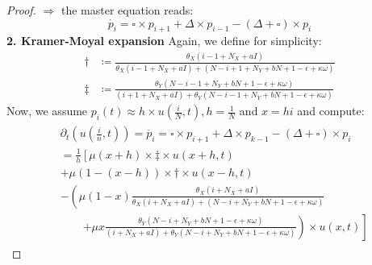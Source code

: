 \begin{proof}
$\Rightarrow$ the master equation reads:
\begin{equation}
	\dot{p_i} = \square\times p_{i+1} + \Delta\times p_{i-1} - \left(\Delta + \square\right)\times p_i
\end{equation}
\textbf{2. Kramer-Moyal expansion}\newline
Again, we define for simplicity:
\begin{align*}
\dagger &\coloneqq \frac{\theta_X (i-1 + N_X + aI)}{\theta_X (i-1 + N_X + aI) + (N-i+1 + N_Y + bN + 1-\epsilon + \kappa\omega)}\\
\ddagger &\coloneqq \frac{\theta_Y(N-i-1 + N_Y + bN +1-\epsilon+\kappa\omega)}{(i+1 + N_X+aI) + \theta_Y(N-i-1 + N_Y + bN +1-\epsilon+\kappa\omega)}
\end{align*}
Now, we assume $p_i(t) \approx h\times u\left(\frac{i}{N}, t\right), h=\frac{1}{N}$ and $x = hi$ and compute:
\begin{align}\label{computation}
\begin{split}
	&\partial_t \left(u\left(\frac{i}{n}, t\right)\right) = \dot{p_i} = \square\times p_{i+1} + \Delta\times p_{k-1} - \left(\Delta + \square\right)\times p_i\\
	&= \frac{1}{h}\left[\mu(x+h)\times \ddagger\times u\left(x+h,t\right)\right.\\
	&\left. + \mu(1-(x-h))\times \dagger \times u\left(x-h,t \right)\right.\\
	&\left.- \left(\mu(1-x)\frac{\theta_X (i + N_X + aI)}{\theta_X (i + N_X + aI) + (N-i + N_Y + bN + 1-\epsilon + \kappa\omega)}\right.\right.\\
		&\qquad \left.\left. + \mu x\frac{\theta_Y(N-i + N_Y + bN +1-\epsilon+\kappa\omega)}{(i + N_X+aI) + \theta_Y(N-i + N_Y + bN +1-\epsilon+\kappa\omega)} \right)\times u\left(x,t\right)\right]
		\end{split}
\end{align}


\end{proof}
